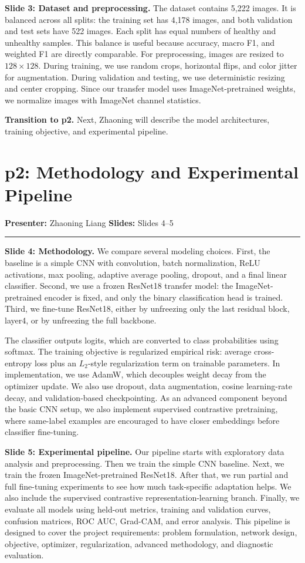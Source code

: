 \documentclass[11pt]{article}
\newcommand{\parthead}[4]{%
  \section*{\textcolor{BerkeleyBlue}{#1: #2}}%
  \noindent\textbf{Presenter:} #3 \hfill \textbf{Slides:} #4%
  \par\vspace{0.4em}\hrule\vspace{0.8em}
}
\begin{document}
\textbf{Slide 3: Dataset and preprocessing.}
The dataset contains 5,222 images. It is balanced across all splits: the training set has 4,178 images, and both validation and test sets have 522 images. Each split has equal numbers of healthy and unhealthy samples. This balance is useful because accuracy, macro F1, and weighted F1 are directly comparable. For preprocessing, images are resized to \(128\times128\). During training, we use random crops, horizontal flips, and color jitter for augmentation. During validation and testing, we use deterministic resizing and center cropping. Since our transfer model uses ImageNet-pretrained weights, we normalize images with ImageNet channel statistics.

\textbf{Transition to p2.}
Next, Zhaoning will describe the model architectures, training objective, and experimental pipeline.

\parthead{p2}{Methodology and Experimental Pipeline}{Zhaoning Liang}{Slides 4--5}

\textbf{Slide 4: Methodology.}
We compare several modeling choices. First, the baseline is a simple CNN with convolution, batch normalization, ReLU activations, max pooling, adaptive average pooling, dropout, and a final linear classifier. Second, we use a frozen ResNet18 transfer model: the ImageNet-pretrained encoder is fixed, and only the binary classification head is trained. Third, we fine-tune ResNet18, either by unfreezing only the last residual block, layer4, or by unfreezing the full backbone.

The classifier outputs logits, which are converted to class probabilities using softmax. The training objective is regularized empirical risk: average cross-entropy loss plus an \(L_2\)-style regularization term on trainable parameters. In implementation, we use AdamW, which decouples weight decay from the optimizer update. We also use dropout, data augmentation, cosine learning-rate decay, and validation-based checkpointing. As an advanced component beyond the basic CNN setup, we also implement supervised contrastive pretraining, where same-label examples are encouraged to have closer embeddings before classifier fine-tuning.

\textbf{Slide 5: Experimental pipeline.}
Our pipeline starts with exploratory data analysis and preprocessing. Then we train the simple CNN baseline. Next, we train the frozen ImageNet-pretrained ResNet18. After that, we run partial and full fine-tuning experiments to see how much task-specific adaptation helps. We also include the supervised contrastive representation-learning branch. Finally, we evaluate all models using held-out metrics, training and validation curves, confusion matrices, ROC AUC, Grad-CAM, and error analysis. This pipeline is designed to cover the project requirements: problem formulation, network design, objective, optimizer, regularization, advanced methodology, and diagnostic evaluation.
\end{document}
